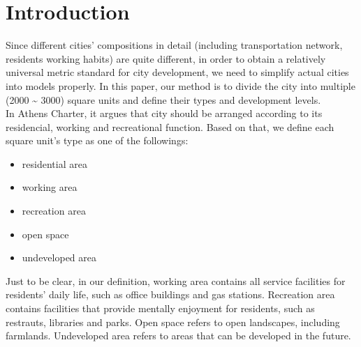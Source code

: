 \section{Introduction}
Since different cities' compositions in detail (including transportation network, residents working habits) are quite different, in order to obtain a relatively universal metric standard for city development, we need to simplify actual cities into models properly.
In this paper, our method is to divide the city into multiple (2000 \~{} 3000) square units and define their types and development levels.
\\
In Athens Charter, it argues that city should be arranged according to its residencial, working and recreational function.
Based on that, we define each square unit's type as one of the followings:
\begin{itemize}
  \item residential area
  \item working area
  \item recreation area
  \item open space
  \item undeveloped area
\end{itemize}
Just to be clear, in our definition, working area contains all service facilities for residents' daily life, such as office buildings and gas stations.
Recreation area contains facilities that provide mentally enjoyment for residents, such as restrauts, libraries and parks.
Open space refers to open landscapes, including farmlands.
Undeveloped area refers to areas that can be developed in the future.
\\
